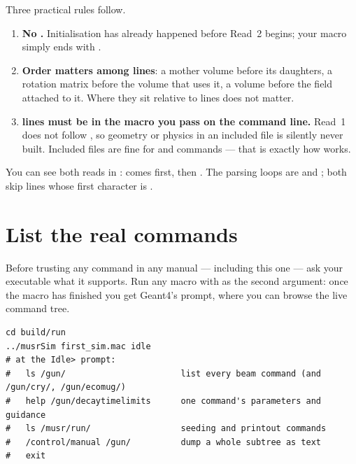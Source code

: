 Three practical rules follow.
\begin{enumerate}
  \item \textbf{No .} Initialisation has already happened before Read~2 begins; your macro simply ends with .
  \item \textbf{Order matters among  lines}: a mother volume before its daughters, a rotation matrix before the volume that uses it, a volume before the field attached to it. Where they sit relative to  lines does not matter.
  \item \textbf{ lines must be in the macro you pass on the command line.} Read~1 does not follow , so geometry or physics in an included file is silently never built. Included files are fine for  and  commands --- that is exactly how  works.
\end{enumerate}

\begin{hood}
You can see both reads in :  comes first, then . The parsing loops are  and ; both skip lines whose first character is \code{#}.
\end{hood}

\section{List the real commands}
\label{sec:listcommands}
Before trusting any command in any manual --- including this one --- ask your executable what it supports. Run any macro with  as the second argument: once the macro has finished you get Geant4's  prompt, where you can browse the live command tree.

\begin{lstlisting}[style=sh,caption={Discovering \texttt{/gun} and \texttt{/musr/run} commands without reading C++}]
cd build/run
../musrSim first_sim.mac idle
# at the Idle> prompt:
#   ls /gun/                       list every beam command (and /gun/cry/, /gun/ecomug/)
#   help /gun/decaytimelimits      one command's parameters and guidance
#   ls /musr/run/                  seeding and printout commands
#   /control/manual /gun/          dump a whole subtree as text
#   exit
\end{lstlisting}

